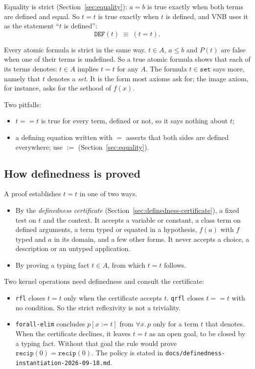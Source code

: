 Equality is strict (Section~\ref{sec:equality}): $a = b$ is true exactly
when both terms are defined and equal.  So $t = t$ is true exactly when
$t$ is defined, and VNB uses it as the statement ``$t$ is defined'':
\[
  \mathtt{DEF}(t) \;\equiv\; (t = t).
\]

Every atomic formula is strict in the same way.  $t \in A$,
$a \le b$ and $P(t)$ are false when one of their terms is undefined.
So a true atomic formula shows that each of its terms denotes: $t \in A$
implies $t = t$ for any $A$.  The formula $t \in \mathtt{set}$ says more,
namely that $t$ denotes a \emph{set}.  It is the form most axioms ask
for; the image axiom, for instance, asks for the sethood of $f(x)$.

Two pitfalls:
\begin{itemize}
\item $t == t$ is true for every term, defined or not, so it says nothing
  about $t$;
\item a defining equation written with $=$ asserts that both sides are
  defined everywhere; use $:=$ (Section~\ref{sec:equality}).
\end{itemize}

\subsection{How definedness is proved}

A proof establishes $t = t$ in one of two ways.
\begin{itemize}
\item By the \emph{definedness certificate}
  (Section~\ref{sec:definedness-certificate}), a fixed test on $t$ and
  the context.  It accepts a variable or constant, a class term on
  defined arguments, a term typed or equated in a hypothesis, $f(a)$ with
  $f$ typed and $a$ in its domain, and a few other forms.  It never
  accepts a choice, a description or an untyped application.
\item By proving a typing fact $t \in A$, from which $t = t$ follows.
\end{itemize}
Two kernel operations need definedness and consult the certificate:
\begin{itemize}
\item \texttt{rfl} closes $t = t$ only when the certificate accepts $t$.
  \texttt{qrfl} closes $t == t$ with no condition.  So the strict
  reflexivity is not a triviality.
\item \texttt{forall-elim} concludes $p[x := t]$ from
  $\forall x.\, p$ only for a term $t$ that denotes.  When the
  certificate declines, it leaves $t = t$ as an open goal, to be closed
  by a typing fact.  Without that goal the rule would prove
  $\mathtt{recip}(0) = \mathtt{recip}(0)$.  The policy is stated in
  \texttt{docs/definedness-instantiation-2026-09-18.md}.
\end{itemize}

